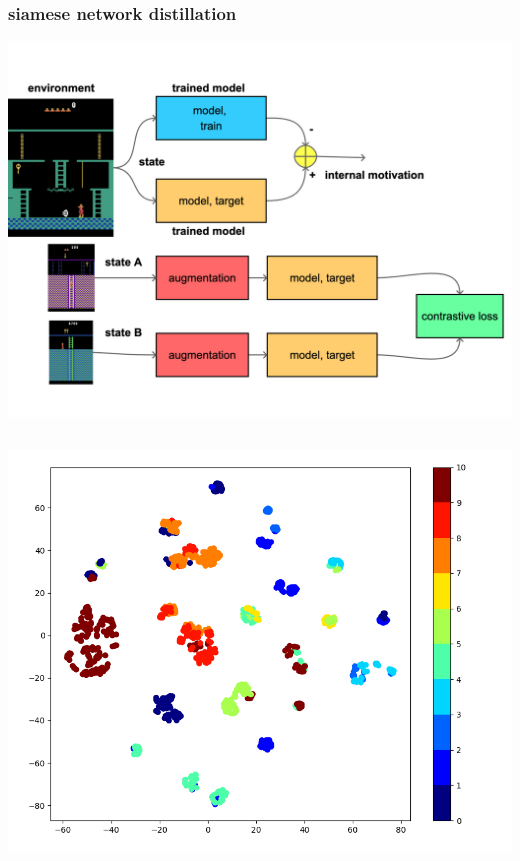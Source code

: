 \documentclass{beamer}
\begin{document}
\begin{frame}
  
  \frametitle{siamese network distillation}

  \centering
  \includegraphics[scale=0.07]{../diagrams/rnd/rndsiamdetail.png}
  \bigskip
  \begin{columns}

    \begin{column}{0.5\textwidth}
      \centering
      \includegraphics[scale=0.2]{../images/rnd_features.png}
    \end{column}


\end{columns}
\end{frame}
\end{document}
